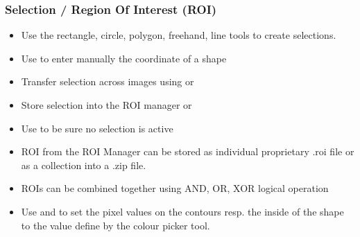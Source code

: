 \documentclass[ignorenonframetext,aspectratio=169,10pt,xcolor=table]{beamer}
\begin{document}
\begin{frame} \frametitle{Selection / Region Of Interest (ROI)}

  \begin{itemize} \setlength\itemsep{1em}
    \item Use the rectangle, circle, polygon, freehand, line tools to
          create selections.
    \item Use  to enter manually the
          coordinate of a shape
    \item Transfer selection across images using
           or 
    \item Store selection into the ROI manager  or 
    \item Use   to
          be sure no selection is active
    \item ROI from the ROI Manager can be stored as individual
          proprietary .roi file or as a collection into a .zip file.
    \item ROIs can be combined together using AND, OR, XOR logical
          operation
    \item Use  and  to set the pixel
          values on the contours resp. the inside of the shape to the value
          define by the colour picker tool.
  \end{itemize}

\end{frame}
\end{document}
